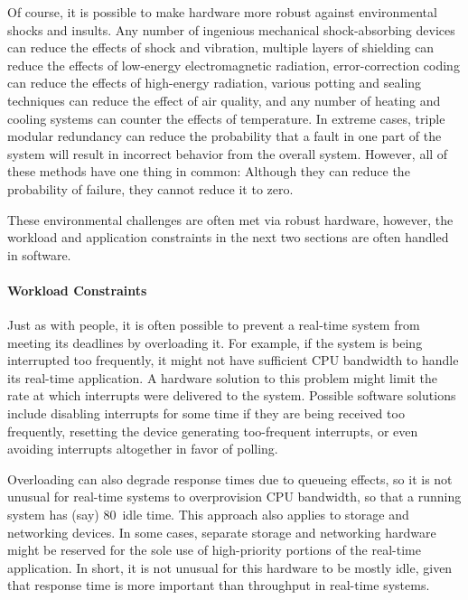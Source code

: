 Of course, it is possible to make hardware more robust against
environmental shocks and insults.
Any number of ingenious mechanical shock-absorbing devices can reduce the
effects of shock and vibration, multiple layers of shielding can reduce
the effects of low-energy electromagnetic radiation, error-correction
coding can reduce the effects of high-energy radiation, various potting
and sealing techniques can reduce the effect of air quality, and any
number of heating and cooling systems can counter the effects of temperature.
In extreme cases, triple modular redundancy can reduce the probability that
a fault in one part of the system will result in incorrect behavior from
the overall system.
However, all of these methods have one thing in common:
Although they can reduce the probability of failure, they cannot reduce
it to zero.

These environmental challenges are often met via robust hardware, however,
the workload and application constraints in the next two sections are
often handled in software.

\paragraph{Workload Constraints}
\label{sec:advsync:Workload Constraints}

Just as with people, it is often possible to prevent a real-time system
from meeting its deadlines by overloading it.
For example, if the system is being interrupted too frequently, it might
not have sufficient CPU bandwidth to handle its real-time application.
A hardware solution to this problem might limit the rate at which
interrupts were delivered to the system.
Possible software solutions include disabling interrupts for some time if
they are being received too frequently,
resetting the device generating too-frequent interrupts,
or even avoiding interrupts altogether in favor of polling.

Overloading can also degrade response times due to queueing effects,
so it is not unusual for real-time systems to overprovision CPU bandwidth,
so that a running system has (say) 80\pct\ idle time.
This approach also applies to storage and networking devices.
In some cases, separate storage and networking hardware might be reserved
for the sole use of high-priority portions of the real-time application.
In short, it is not unusual for this hardware to be mostly idle, given
that response time is more important than throughput in
real-time systems.

